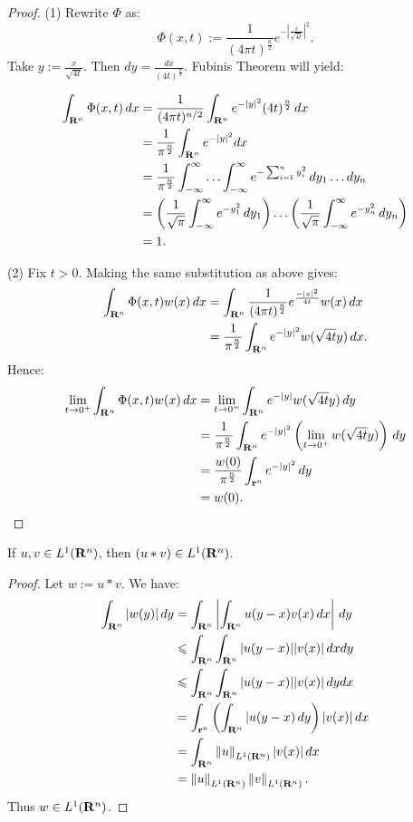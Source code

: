 	\begin{proof}
		(1) Rewrite $\Phi$ as:
		\[
		\Phi(x,t):= \frac{1}{(4\pi t)^{\frac{n}{2}}}e^{-\left|\frac{x}{\sqrt{4t}}\right|^2}.
		\] 
		Take $y := \frac{x}{\sqrt{4t}}$. Then $dy = \frac{dx}{(4t)^{\frac{n}{2}}}$. Fubinis Theorem will yield:

		\begin{align*}
			\int_{\mathbf{R}^n}^{} \Phi(x,t)\,dx
			&= \frac{1}{(4 \pi t)^{n/2}}\int_{\mathbf{R}^n}^{} e^{-|y|^2}(4t)^{\frac{n}{2}}\,dx \\
			&= \frac{1}{\pi^{\frac{n}{2}}}\int_{\mathbf{R}^n}^{} e^{-|y|^2}dx \\
			&= \frac{1}{\pi^{\frac{n}{2}}} \int_{-\infty}^{\infty} \ldots \int_{-\infty}^{\infty} e^{-\sum_{i=1}^{n} y_i^2}\,dy_1\ldots dy_n \\
			&= \left( \frac{1}{\sqrt{\pi}} \int_{-\infty}^{\infty} e^{-y_1^2}\,dy_1 \right) \ldots \left( \frac{1}{\sqrt{\pi}} \int_{-\infty}^{\infty} e^{-y_n^2}\,dy_n \right)  \\
			&= 1.
		\end{align*}

		(2) Fix $t > 0$. Making the same substitution as above gives:
		\begin{align*}
			\int_{\mathbf{R}^n}^{} \Phi(x,t)w(x)\,dx
			&= \int_{\mathbf{R}^n}^{} \frac{1}{(4\pi t)^{\frac{n}{2}}}e^{\frac{-|x|^2}{4t}}w(x)\,dx \\
			&= \frac{1}{\pi^{\frac{n}{2}}}\int_{\mathbf{R}^n}^{} e^{-|y|^2}w(\sqrt{4t}y)\,dx.
		\end{align*}
		Hence:
		\begin{align*}
			\lim_{t \rightarrow 0^+}\int_{\mathbf{R}^n}^{} \Phi(x,t)w(x)\,dx
			&= \lim_{t \rightarrow 0^=} \int_{\mathbf{R}^n}^{} e^{-|y|}w(\sqrt{4t}y)\,dy  \\
			&= \frac{1}{\pi^{\frac{n}{2}}}\int_{\mathbf{R}^n}^{}  e^{-|y|^2} \left( \lim_{t \rightarrow 0^+} w(\sqrt{4t}y) \right)\,dy \\
			&= \frac{w(0)}{\pi^{\frac{n}{2}}} \int_{\mathbf{r}^n}^{} e^{-|y|^2}\,dy  \\
			&= w(0). \qedhere
		\end{align*}
	\end{proof}

\begin{lemma}
	If $u,v \in L^1(\mathbf{R}^n)$, then $(u \ast v) \in L^1(\mathbf{R}^n)$.
\end{lemma}
	\begin{proof}
		Let $w:=u\ast v$. We have:
		\begin{align*}
			\int_{\mathbf{R}^n}^{} |w(y)|\,dy
			&= \int_{\mathbf{R}^n}^{} \left| \int_{\mathbf{R}^n}^{} u(y-x)v(x)\,dx \right| \,dy \\
			&\leqslant \int_{\mathbf{R}^n}^{} \int_{\mathbf{R}^n}^{} |u(y-x)||v(x)|\,dxdy \\
			&\leqslant \int_{\mathbf{R}^n}^{} \int_{\mathbf{R}^n}^{} |u(y-x)||v(x)|\,dydx \\
			&= \int_{\mathbf{r}^n}^{} \left( \int_{\mathbf{R}^n}^{} |u(y-x)\,dy \right) |v(x)|\,dx \\
			&= \int_{\mathbf{R}^n}^{} \left\lVert u \right\rVert_{L^1(\mathbf{R}^n)}|v(x)|\,dx \\
			&= \left\lVert u \right\rVert_{L^1(\mathbf{R}^n)}\left\lVert v \right\rVert_{L^1(\mathbf{R}^n)}.
		\end{align*}
		Thus $w \in L^1(\mathbf{R}^n)$.
	\end{proof}

